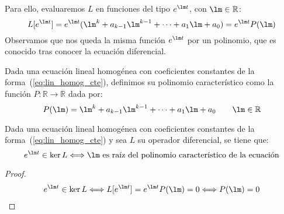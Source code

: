 \noindent
Para ello, evaluaremos $L$ en funciones del tipo $e^{\lm t}$, con $\lm \in \mathbb{R}$:
\begin{equation*}
    L[e^{\lm t}] = e^{\lm t}(\lm^{k} + a_{k-1}\lm^{k-1} + \cdots + a_1 \lm + a_0) = e^{\lm t} P(\lm)
\end{equation*}
Observamos que nos queda la misma función $e^{\lm t}$ por un polinomio, que es conocido tras conocer la ecuación diferencial.

\begin{definicion}
    Dada una ecuación lineal homogénea con coeficientes constantes de la forma~(\ref{eq:lin_homog_cte}), definimos su polinomio característico como la función $P:\mathbb{R}\rightarrow\mathbb{R}$ dada por:
    \begin{equation*}
        P(\lm) = \lm^{k} + a_{k-1}\lm^{k-1} + \cdots + a_1 \lm + a_0 \qquad \lm \in \mathbb{R}
    \end{equation*}
\end{definicion}

\begin{prop}
    Dada una ecuación lineal homogénea con coeficientes constantes de la forma~(\ref{eq:lin_homog_cte}) y sea $L$ su operador diferencial, se tiene que:
    \begin{equation*}
        e^{\lm t} \in \ker L \Longleftrightarrow \lm \text{\ es raíz del polinomio característico de la ecuación}
    \end{equation*}
    \begin{proof}
        \begin{align*}
            e^{\lm t} \in \ker L \Longleftrightarrow L[e^{\lm t}] = e^{\lm t} P(\lm) = 0 \Longleftrightarrow P(\lm) = 0
        \end{align*}
    \end{proof}
\end{prop}

